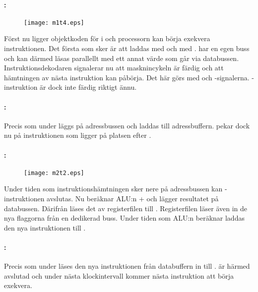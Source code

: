 \documentclass[main.tex]{subfiles}
\newcommand{\diagw}{0.8\textwidth}
\begin{document}
\paragraph{: }
\begin{figure}[H]
    \center
    \texttt{[image: m1t4.eps]}
\end{figure}
Först nu ligger objektkoden för  i  och processorn kan
börja exekvera instruktionen. Det första som sker är att  laddas med
 och  med .  har en egen buss och kan därmed
läsas parallellt med ett annat värde som går via databussen.
Instruktionsdekodaren signalerar nu att masknincykeln är färdig och att
hämtningen av nästa instruktion kan påbörja. Det här görs med 
och -signalerna. -instruktion är dock inte
färdig riktigt ännu.

\paragraph{: }
Precis som under  läggs  på adressbussen och laddas till
adressbuffern.  pekar dock nu på instruktionen som ligger på platsen
efter .

\paragraph{: }
\begin{figure}[H]
    \center
    \texttt{[image: m2t2.eps]}
\end{figure}
Under tiden som instruktionshämtningen sker nere på adressbussen kan -instruktionen avslutas. Nu beräknar ALU:n + och lägger
resultatet på databussen. Därifrån läses det av registerfilen till .
Registerfilen läser även in de nya flaggorna från en dedikerad buss. Under
tiden som ALU:n beräknar laddas den nya instruktionen till . 

\paragraph{: }
Precis som under  läses den nya instruktionen från databuffern in
till .  är härmed avslutad och under nästa
klockintervall kommer nästa instruktion att börja exekvera.
\end{document}
